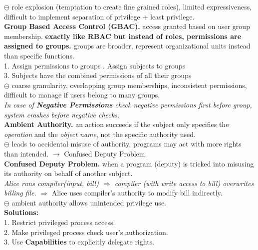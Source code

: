 \documentclass[main.tex]{subfiles}
\begin{document}
\begin{minipage}[t]{0.495\textwidth}
	$\ominus$ role explosion (temptation to create fine grained roles), limited expressiveness, difficult to implement separation of privilege + least privilege.\\
	\textbf{Group Based Access Control (GBAC).} access granted based on user group membership. \textbf{exactly like RBAC but instead of roles, permissions are assigned to groups.} groups are broader, represent organizational units instead than specific functions.\\
	1. Assign permissions to groups . Assign subjects to groups\\
	3. Subjects have the combined permissions of all their groups\\
	$\ominus$ coarse granularity, overlapping group memberships, inconsistent permissions, difficult to manage if users belong to many groups.\\
	\textit{In case of \textbf{Negative Permissions} check negative permissions first before group, \warning system crashes before negative checks.}\\[1px]
	\textbf{Ambient Authority.} an action succeeds if the subject only specifies the \textit{operation} and the \textit{object name}, not the specific authority used. \\
	$\ominus$ leads to accidental misuse of authority, programs may act with more rights than intended. $\rightarrow$ Confused Deputy Problem.\\
	\textbf{Confused Deputy Problem.} when a program (deputy) is tricked into misusing its authority on behalf of another subject.\\
	\textit{Alice runs compiler(input, bill) $\Rightarrow$ compiler (with write access to bill) overwrites billing file.} $\Rightarrow$ Alice uses compiler’s authority to modify bill indirectly.\\
	$\ominus$ ambient authority allows unintended privilege use.\\
	\textbf{Solutions:}\\
	1. Restrict privileged process access.\\
	2. Make privileged process check user’s authorization.\\
	3. Use \textbf{Capabilities} to explicitly delegate rights.\\
\end{minipage}
\hfill
\end{document}
